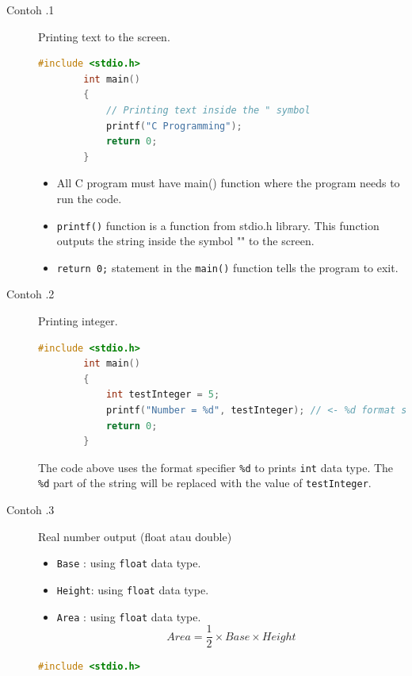 \begin{description}
	\item[Contoh \thesubsection.1]  Printing text to the screen.
		\begin{lstlisting}[language=c,caption = Print text "C Programming" Ke layar,captionpos=t]
		#include <stdio.h>    
		int main()
		{ 
			// Printing text inside the " symbol
			printf("C Programming");
			return 0;
		}
	\end{lstlisting}
		\begin{itemize}
			\item All C program must have main() function where the program needs to run the code.
			\item \verb*|printf()| function is a function from stdio.h library. This function outputs the string inside the symbol "" to the screen.
			\item \verb*|return 0;| statement in the \verb*|main()| function tells the program to exit.
		\end{itemize}
	\item [Contoh \thesubsection.2] Printing integer.
	      \begin{lstlisting}[language=c,captionpos=t]
		#include <stdio.h>
		int main()
		{
			int testInteger = 5;
			printf("Number = %d", testInteger); // <- %d format string
			return 0;
		}
	\end{lstlisting}


	      The code above uses the format specifier \verb*|%d| to prints \verb*|int| data type. The \verb*|%d| part of the string will be replaced with the value of \verb*|testInteger|.

	\item[Contoh \thesubsection.3] Real number output (float atau double)
		\begin{itemize}\label{eq:LuasSegitiga}
			\item \verb|Base|  : using \verb|float| data type.
			\item \verb|Height|: using \verb|float| data type.
			\item \verb|Area|  : using \verb|float| data type.
			      \begin{equation}
				      Area = \frac{1}{2} \times Base \times Height
			      \end{equation}
		\end{itemize}
		\begin{lstlisting}[language=c,captionpos=t]
		#include <stdio.h>
		

\end{lstlisting}
\end{description}
